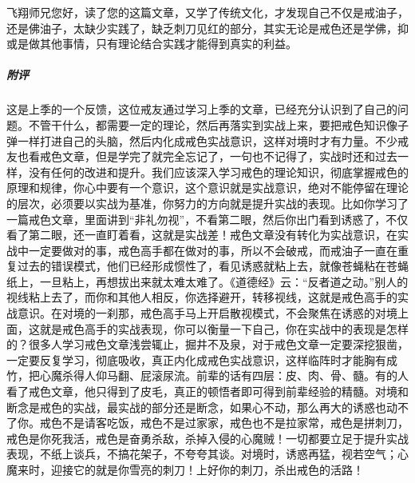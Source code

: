\begin{case}
    飞翔师兄您好，读了您的这篇文章，又学了传统文化，才发现自己不仅是戒油子，还是佛油子，太缺少实践了，缺乏刺刀见红的部分，其实无论是戒色还是学佛，抑或是做其他事情，只有理论结合实践才能得到真实的利益。
    \subparagraph{附评} 这是上季的一个反馈，这位戒友通过学习上季的文章，已经充分认识到了自己的问题。不管干什么，都需要一定的理论，然后再落实到实战上来，要把戒色知识像子弹一样打进自己的头脑，然后内化成戒色实战意识，这样对境时才有力量。不少戒友也看戒色文章，但是学完了就完全忘记了，一句也不记得了，实战时还和过去一样，没有任何的改进和提升。我们应该深入学习戒色的理论知识，彻底掌握戒色的原理和规律，你心中要有一个意识，这个意识就是实战意识，绝对不能停留在理论的层次，必须要以实战为基准，你努力的方向就是提升实战的表现。比如你学习了一篇戒色文章，里面讲到“非礼勿视”，不看第二眼，然后你出门看到诱惑了，不仅看了第二眼，还一直盯着看，这就是实战差！戒色文章没有转化为实战意识，在实战中一定要做对的事，戒色高手都在做对的事，所以不会破戒，而戒油子一直在重复过去的错误模式，他们已经形成惯性了，看见诱惑就粘上去，就像苍蝇粘在苍蝇纸上，一旦粘上，再想拔出来就太难太难了。《道德经》云：“反者道之动。”别人的视线粘上去了，而你和其他人相反，你选择避开，转移视线，这就是戒色高手的实战意识。在对境的一刹那，戒色高手马上开启散视模式，不会聚焦在诱惑的对境上面，这就是戒色高手的实战表现，你可以衡量一下自己，你在实战中的表现是怎样的？很多人学习戒色文章浅尝辄止，掘井不及泉，对于戒色文章一定要深挖狠凿，一定要反复学习，彻底吸收，真正内化成戒色实战意识，这样临阵时才能胸有成竹，把心魔杀得人仰马翻、屁滚尿流。前辈的话有四层：皮、肉、骨、髓。有的人看了戒色文章，他只得到了皮毛，真正的顿悟者即可得到前辈经验的精髓。对境和断念是戒色的实战，最实战的部分还是断念，如果心不动，那么再大的诱惑也动不了你。戒色不是请客吃饭，戒色不是过家家，戒色也不是拉家常，戒色是拼刺刀，戒色是你死我活，戒色是奋勇杀敌，杀掉入侵的心魔贼！一切都要立足于提升实战表现，不纸上谈兵，不搞花架子，不夸夸其谈。对境时，诱惑再猛，视若空气；心魔来时，迎接它的就是你雪亮的刺刀！上好你的刺刀，杀出戒色的活路！
\end{case}

